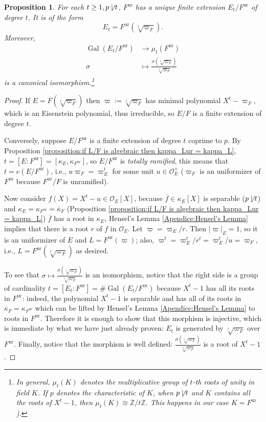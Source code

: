\documentclass[12pt]{article}
\theoremstyle{plain}
\newtheorem{proposition}[theorem]{Proposition}
\theoremstyle{definition}
\newcommand{\integers}{\mathbb{Z}}
\newcommand{\abs}[1]{\left \vert #1 \right \vert}
\renewcommand{\bar}[1]{\overline{#1}}
\newcommand{\Gal}[2]{\operatorname{Gal} ( #1 / #2 )}
\renewcommand{\O}{\mathcal{O}}
\newcommand{\ur}[1]{{#1}^{\operatorname{ur}}}
\begin{document}
\begin{proposition}\label{proposition:for each t coprime with p Fur has a unique finite extension Et of degree t}
For each $t \geq 1, p \not \mid t$, $\ur F$ has a unique finite extension $E_t / \ur F$ of degree $t$. It is of the form
\[
    E_t = \ur F ( \sqrt[t] {\varpi_F}).
\]
Moreover,
\begin{align*}
    \Gal {E_t} {\ur F} &\longrightarrow \mu_t (\ur F) \\
    \sigma &\longmapsto \frac{\sigma (\sqrt [t] {\varpi_F})}{\sqrt[t] {\varpi_F}}
\end{align*}
is a canonical isomorphism.\footnote{In general, $\mu_t (K)$ denotes the multiplicative group of $t$-th roots of unity in field $K$. If $p$ denotes the characteristic of $K$, when $p \not \mid t$ and $K$ contains all the roots of $X^t - 1$, then $\mu_t (K) \cong \integers / t \integers$. This happens in our case $K = \ur F$).}
\end{proposition}
\begin{proof}
If $E = F (\sqrt[t]{\varpi_F})$ then $\varpi := \sqrt[t]{\varpi_F}$ has minimal polynomial $X^t - \varpi_F$, which is an Eisenstein polynomial, thus irreducible, so $E/F$ is a finite extension of degree $t$.

Conversely, suppose $E/\ur F$ is a finite extension of degree $t$ coprime to $p$. By Proposition \ref{proposition:if L/F is algebraic then kappa_Lur = kappa_L}, $t = [E : \ur F] = [\kappa_E, \kappa_{\ur F}]$, so $E/\ur F$ is \textit{totally ramified}, this means that $t = e(E / \ur F)$, i.e., $u \varpi_F = \varpi_E^t$ for some unit $u \in \O_E^\times$ ($\varpi_F$ is an uniformizer of $\ur F$ because $\ur F / F$ is unramified).

Now consider $f (X) = X^t - u \in \O_E [X]$, because $\bar f \in \kappa_E [X]$ is separable ($p \not \mid t$) and $\kappa_E = \kappa_{\ur F} = \bar \kappa_F$ (Proposition \ref{proposition:if L/F is algebraic then kappa_Lur = kappa_L}) $\bar f$ has a root in $\kappa_E$, Hensel's Lemma \ref{Apendice:Hensel's Lemma} implies that there is a root $r$ of $f$ in $\O_E$. Let $\varpi = \varpi_E/r$. Then $\abs {\varpi}_E = 1$, so it is an uniformizer of $E$ and $L = \ur F (\varpi)$; also, $\varpi^t = \varpi_E^t / r^t = \varpi_E^t / u = \varpi_F$, i.e., $L = \ur F ( \sqrt[t]{\varpi_F})$ as desired.

\bigskip

To see that $\sigma \mapsto \frac{\sigma (\sqrt[t]{\varpi_F})}{\sqrt[t]{\varpi_F}}$ is an isomorphism, notice that the right side is a group of cardinality $t = [E_t: \ur F]= \# \Gal {E_t}{\ur F}$ because $X^t - 1$ has all its roots in $\ur F$: indeed, the polynomial $X^t - \bar 1$ is separable and has all of its roots in $\bar \kappa_F = \kappa_{\ur F}$ which can be lifted by Hensel's Lemma \ref{Apendice:Hensel's Lemma} to roots in $\ur F$. Therefore it is enough to show that this morphism is injective, which is immediate by what we have just already proven: $E_t$ is generated by $\sqrt[t]{\varpi_F}$ over $\ur F$. Finally, notice that the morphism is well defined: $\frac{\sigma (\sqrt[t]{\varpi_F})}{ \sqrt[t]{\varpi_F}}$ is a root of $X^t - 1$.
\end{proof}
\end{document}
